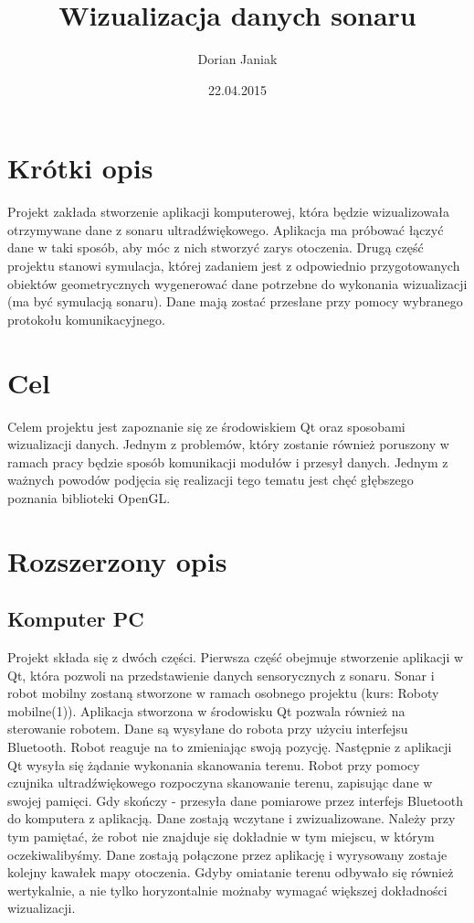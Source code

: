 \documentclass[a4paper,12pt]{article}
\title{Wizualizacja danych sonaru}
\author{Dorian Janiak}
\date{22.04.2015}
\begin{document}
\maketitle

\section{Krótki opis}
Projekt zakłada stworzenie aplikacji komputerowej, która będzie wizualizowała
otrzymywane dane z sonaru ultradźwiękowego. Aplikacja ma próbować łączyć dane
w taki sposób, aby móc z nich stworzyć zarys otoczenia. Drugą część projektu
stanowi symulacja, której zadaniem jest z odpowiednio przygotowanych obiektów
geometrycznych wygenerować dane potrzebne do wykonania wizualizacji 
(ma być symulacją sonaru). 
Dane mają zostać przesłane przy pomocy wybranego protokołu komunikacyjnego.

\section{Cel}
Celem projektu jest zapoznanie się ze środowiskiem Qt oraz sposobami wizualizacji danych.
Jednym z problemów, który zostanie również poruszony w ramach pracy będzie 
sposób komunikacji modułów i przesył danych. Jednym z ważnych powodów podjęcia się realizacji tego tematu
jest chęć głębszego poznania biblioteki OpenGL. 

\section{Rozszerzony opis}
\subsection{Komputer PC}
Projekt składa się z dwóch części. Pierwsza część obejmuje stworzenie aplikacji
w Qt, która pozwoli na przedstawienie danych sensorycznych z sonaru.
Sonar i robot mobilny zostaną stworzone w ramach osobnego projektu (kurs: Roboty mobilne(1)).
Aplikacja stworzona w środowisku Qt pozwala również na sterowanie robotem. 
Dane są wysyłane do robota przy użyciu interfejsu Bluetooth. Robot reaguje na to zmieniając swoją
pozycję. Następnie z aplikacji Qt wysyła się żądanie wykonania skanowania terenu. 
Robot przy pomocy czujnika ultradźwiękowego rozpoczyna skanowanie terenu, zapisując dane w
swojej pamięci. Gdy skończy - przesyła dane pomiarowe przez interfejs Bluetooth do komputera z 
aplikacją. Dane zostają wczytane i zwizualizowane. Należy przy tym pamiętać, że robot
nie znajduje się dokładnie w tym miejscu, w którym oczekiwalibyśmy. Dane zostają połączone
przez aplikację i wyrysowany zostaje kolejny kawałek mapy otoczenia. Gdyby omiatanie terenu
odbywało się również wertykalnie, a nie tylko horyzontalnie możnaby wymagać większej
dokładności wizualizacji.
\end{document}
